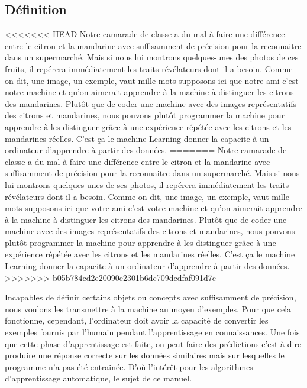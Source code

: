 \documentclass[french,a4paper,12pt]{article}
\begin{document}
\subsection{Définition}
<<<<<<< HEAD
\quad Notre camarade de classe a du mal à faire une différence entre le citron et la mandarine avec suffisamment de précision pour la reconnaitre dans un supermarché. Mais si nous lui montrons quelques-unes des  photos de ces fruits, il repérera immédiatement les traits révélateurs dont il a besoin. Comme on dit, une image, un exemple, vaut mille mots supposons ici que notre ami c’est notre machine et qu’on aimerait apprendre à la machine à distinguer les citrons des mandarines. Plutôt que de coder une machine avec des images représentatifs des citrons et mandarines, nous pouvons plutôt programmer la machine pour apprendre à les distinguer grâce à une expérience répétée avec les citrons et les mandarines réelles. C’est ça le machine Learning donner la capacite à un ordinateur d’apprendre à partir des données.
=======
\quad Notre camarade de classe a du mal à faire une différence entre le citron et la mandarine avec suffisamment de précision pour la reconnaitre dans un supermarché. Mais si nous lui montrons quelques-unes de ses photos, il repérera immédiatement les traits révélateurs dont il a besoin. Comme on dit, une image, un exemple, vaut mille mots supposons ici que votre ami c’est votre machine et qu’on aimerait apprendre à la machine à distinguer les citrons des mandarines. Plutôt que de coder une machine avec des images représentatifs des citrons et mandarines, nous pouvons plutôt programmer la machine pour apprendre à les distinguer grâce à une expérience répétée avec les citrons et les mandarines réelles. C’est ça le machine Learning donner la capacite à un ordinateur d’apprendre à partir des données.
>>>>>>> b05b784cd2e20090e2301b6dc709dcdfaf091d7c

\quad Incapables de définir certains objets ou concepts avec suffisamment de précision, nous voulons les transmettre à la machine au moyen d'exemples\citep{elnaqa}. Pour que cela fonctionne, cependant, l'ordinateur doit avoir la capacité de convertir les exemples fournis par l’humain pendant l’apprentissage en connaissances. Une fois que cette phase d’apprentissage est faite, on peut faire des prédictions c’est à dire produire une réponse correcte sur les données similaires mais sur lesquelles le programme n’a pas été entrainée.   D'où l’intérêt pour les algorithmes d’apprentissage automatique, le sujet de ce manuel.
\end{document}
